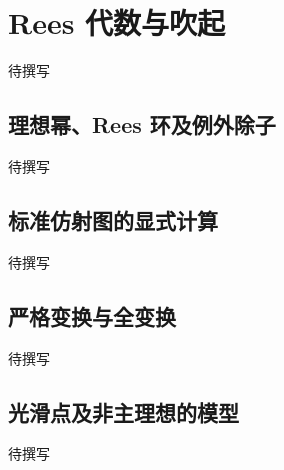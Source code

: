 
% 
% 

\section{Rees 代数与吹起}
\label{g5:sec:1403}

待撰写

\subsection{理想幂、Rees 环及例外除子}
\label{g5:subsec:1403:01}
待撰写

\subsection{标准仿射图的显式计算}
\label{g5:subsec:1403:02}
待撰写

\subsection{严格变换与全变换}
\label{g5:subsec:1403:03}
待撰写

\subsection{光滑点及非主理想的模型}
\label{g5:subsec:1403:04}
待撰写
